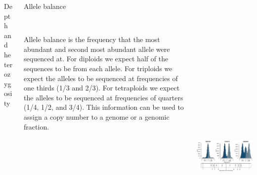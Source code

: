 \begin{columns}[t]
\begin{column}{0.40\textwidth}
\begin{block}{\large Depth and heterozygosity}
    \end{block}
  \end{column}

  \begin{column}{0.52\textwidth}
    \begin{block}{\large Allele balance}
      \begin{columns}
        \begin{column}{0.49\textwidth}
\scriptsize
\\
\vspace{1mm}
Allele balance is the frequency that the most abundant and second most abundant allele were sequenced at.
For diploids we expect half of the sequences to be from each allele.
For triploids we expect the alleles to be sequenced at frequencies of one thirds (1/3 and 2/3).
For tetraploids we expect the alleles to be sequenced at frequencies of quarters (1/4, 1/2, and 3/4).
This information can be used to assign a copy number to a genome or a genomic fraction.
        \end{column}
        \begin{column}{0.4\textwidth}
          \includegraphics[height=14cm]{./figures/fig1_ab_example.pdf}
        \end{column}
      \end{columns}

    \end{block}
  \end{column}


\end{columns}


